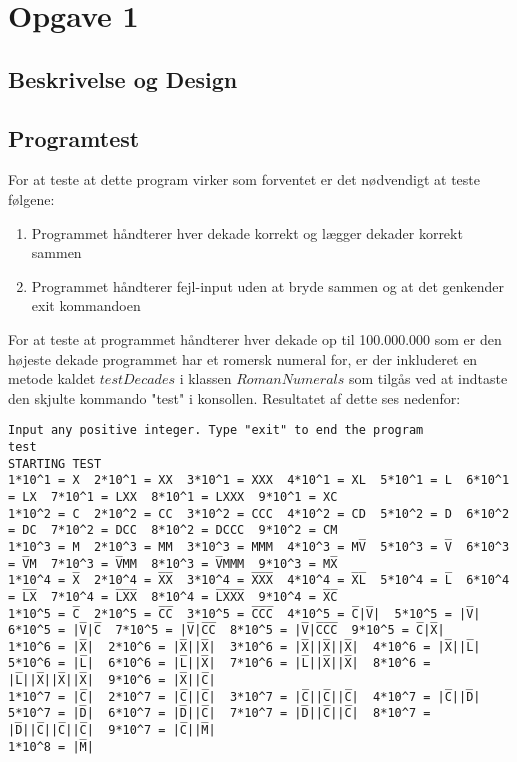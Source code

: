 \section{Opgave 1}
\subsection{Beskrivelse og Design}




\subsection{Programtest}
	For at teste at dette program virker som forventet er det nødvendigt at teste følgene:
 	\begin{enumerate}
 		\item Programmet håndterer hver dekade korrekt og lægger dekader korrekt sammen
 		\item Programmet håndterer fejl-input uden at bryde sammen og at det genkender exit kommandoen
 	\end{enumerate}
 	For at teste at programmet håndterer hver dekade op til 100.000.000 som er den højeste dekade programmet har et romersk numeral for, er der inkluderet en metode kaldet $testDecades$ i klassen $RomanNumerals$ som tilgås ved at indtaste den skjulte kommando "test" i konsollen. Resultatet af dette ses nedenfor:
	\begin{lstlisting}[caption=output fra kørsel af testDecades]
Input any positive integer. Type "exit" to end the program
test
STARTING TEST
1*10^1 = X  2*10^1 = XX  3*10^1 = XXX  4*10^1 = XL  5*10^1 = L  6*10^1 = LX  7*10^1 = LXX  8*10^1 = LXXX  9*10^1 = XC  
1*10^2 = C  2*10^2 = CC  3*10^2 = CCC  4*10^2 = CD  5*10^2 = D  6*10^2 = DC  7*10^2 = DCC  8*10^2 = DCCC  9*10^2 = CM  
1*10^3 = M  2*10^3 = MM  3*10^3 = MMM  4*10^3 = MV̅  5*10^3 = V̅  6*10^3 = V̅M  7*10^3 = V̅MM  8*10^3 = V̅MMM  9*10^3 = MX̅  
1*10^4 = X̅  2*10^4 = X̅X̅  3*10^4 = X̅X̅X̅  4*10^4 = X̅L̅  5*10^4 = L̅  6*10^4 = L̅X̅  7*10^4 = L̅X̅X̅  8*10^4 = L̅X̅X̅X̅  9*10^4 = X̅C̅  
1*10^5 = C̅  2*10^5 = C̅C̅  3*10^5 = C̅C̅C̅  4*10^5 = C̅|V̅|  5*10^5 = |V̅|  6*10^5 = |V̅|C̅  7*10^5 = |V̅|C̅C̅  8*10^5 = |V̅|C̅C̅C̅  9*10^5 = C̅|X̅|  
1*10^6 = |X̅|  2*10^6 = |X̅||X̅|  3*10^6 = |X̅||X̅||X̅|  4*10^6 = |X̅||L̅|  5*10^6 = |L̅|  6*10^6 = |L̅||X̅|  7*10^6 = |L̅||X̅||X̅|  8*10^6 = |L̅||X̅||X̅||X̅|  9*10^6 = |X̅||C̅|  
1*10^7 = |C̅|  2*10^7 = |C̅||C̅|  3*10^7 = |C̅||C̅||C̅|  4*10^7 = |C̅||D̅|  5*10^7 = |D̅|  6*10^7 = |D̅||C̅|  7*10^7 = |D̅||C̅||C̅|  8*10^7 = |D̅||C̅||C̅||C̅|  9*10^7 = |C̅||M̅|  
1*10^8 = |M̅|  
	\end{lstlisting}
